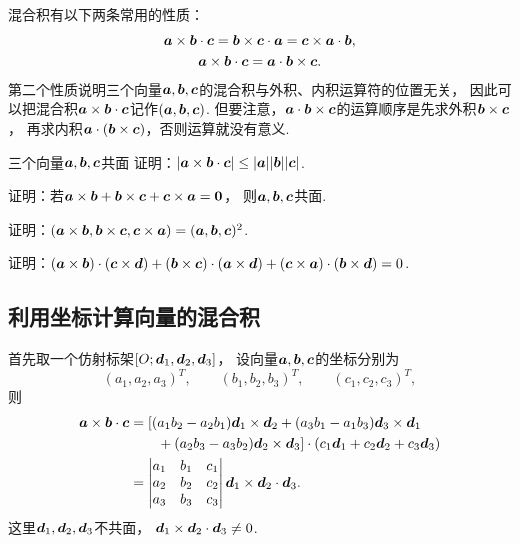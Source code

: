 混合积有以下两条常用的性质：
\begin{gather}
	\boldsymbol{a}\times\boldsymbol{b}\cdot\boldsymbol{c}
	= \boldsymbol{b}\times\boldsymbol{c}\cdot\boldsymbol{a}
	= \boldsymbol{c}\times\boldsymbol{a}\cdot\boldsymbol{b}, \\
	\boldsymbol{a}\times\boldsymbol{b}\cdot\boldsymbol{c}
	= \boldsymbol{a}\cdot\boldsymbol{b}\times\boldsymbol{c}.
\end{gather}
第二个性质说明三个向量\(\boldsymbol{a},\boldsymbol{b},\boldsymbol{c}\)的混合积与外积、内积运算符的位置无关，
因此可以把混合积\(\boldsymbol{a}\times\boldsymbol{b}\cdot\boldsymbol{c}\)记作\((\boldsymbol{a},\boldsymbol{b},\boldsymbol{c})\).
但要注意，\(\boldsymbol{a}\cdot\boldsymbol{b}\times\boldsymbol{c}\)的运算顺序是先求外积\(\boldsymbol{b}\times\boldsymbol{c}\)，
再求内积\(\boldsymbol{a}\cdot(\boldsymbol{b}\times\boldsymbol{c})\)，否则运算就没有意义.

\begin{example}
三个向量\(\boldsymbol{a},\boldsymbol{b},\boldsymbol{c}\)共面
证明：\(\abs{\boldsymbol{a}\times\boldsymbol{b}\cdot\boldsymbol{c}}
\leq \abs{\boldsymbol{a}} \abs{\boldsymbol{b}} \abs{\boldsymbol{c}}\).
\end{example}

\begin{example}
证明：若\(\boldsymbol{a}\times\boldsymbol{b}
+ \boldsymbol{b}\times\boldsymbol{c}
+ \boldsymbol{c}\times\boldsymbol{a}
= \boldsymbol{0}\)，
则\(\boldsymbol{a},\boldsymbol{b},\boldsymbol{c}\)共面.
\end{example}

\begin{example}
证明：\((\boldsymbol{a}\times\boldsymbol{b},\boldsymbol{b}\times\boldsymbol{c},\boldsymbol{c}\times\boldsymbol{a})
= (\boldsymbol{a},\boldsymbol{b},\boldsymbol{c})^2\).
\end{example}

\begin{example}
证明：\((\boldsymbol{a}\times\boldsymbol{b})\cdot(\boldsymbol{c}\times\boldsymbol{d})
+ (\boldsymbol{b}\times\boldsymbol{c})\cdot(\boldsymbol{a}\times\boldsymbol{d})
+ (\boldsymbol{c}\times\boldsymbol{a})\cdot(\boldsymbol{b}\times\boldsymbol{d})
= 0\).
\end{example}

\subsection{利用坐标计算向量的混合积}
首先取一个仿射标架\([O;\boldsymbol{d}_1,\boldsymbol{d}_2,\boldsymbol{d}_3]\)，
设向量\(\boldsymbol{a},\boldsymbol{b},\boldsymbol{c}\)的坐标分别为\[
	(a_1,a_2,a_3)^T, \qquad
	(b_1,b_2,b_3)^T, \qquad
	(c_1,c_2,c_3)^T,
\]
则\begin{equation}
\begin{split}
	\boldsymbol{a}\times\boldsymbol{b}\cdot\boldsymbol{c}
	&= [(a_1 b_2 - a_2 b_1) \boldsymbol{d}_1 \times \boldsymbol{d}_2
	+ (a_3 b_1 - a_1 b_3) \boldsymbol{d}_3 \times \boldsymbol{d}_1 \\
	&\hspace{20pt}
	+ (a_2 b_3 - a_3 b_2) \boldsymbol{d}_2 \times \boldsymbol{d}_3]
	\cdot (c_1 \boldsymbol{d}_1 + c_2 \boldsymbol{d}_2 + c_3 \boldsymbol{d}_3) \\
	&= \begin{vmatrix}
		a_1 & b_1 & c_1 \\
		a_2 & b_2 & c_2 \\
		a_3 & b_3 & c_3
	\end{vmatrix}
	\boldsymbol{d}_1 \times \boldsymbol{d}_2 \cdot \boldsymbol{d}_3.
\end{split}
\end{equation}
这里\(\boldsymbol{d}_1,\boldsymbol{d}_2,\boldsymbol{d}_3\)不共面，
\(\boldsymbol{d}_1\times\boldsymbol{d}_2\cdot\boldsymbol{d}_3\neq0\).

